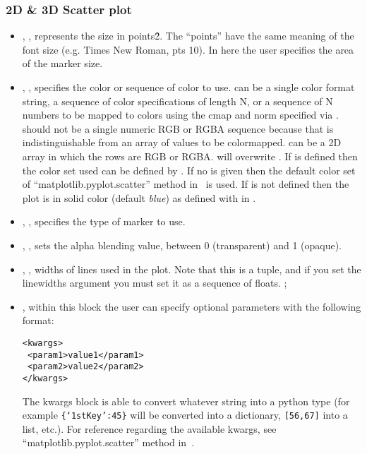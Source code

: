 \subsubsection{2D \& 3D Scatter plot}
  \begin{itemize}
    \item {}, , represents the size
    in points\^2. The ``points'' have the same meaning of the font size (e.g. Times New Roman, pts 10).
    In here the user specifies the area of the marker size.
    \item {}, , specifies the color or
    sequence of color to use.
     can be a single color format string, a sequence of color
    specifications of length N, or a sequence of N numbers to be mapped to
    colors using the cmap and norm specified via .
    \nb {} should not be a single numeric RGB or RGBA sequence because
    that is indistinguishable from an array of values to be colormapped.
     can be a 2D array in which the rows are RGB or RGBA.
    \nb {} will  overwrite .  If  is defined then the color set used can be defined by . 
    If no  is given then the default color set of  ``matplotlib.pyplot.scatter'' method in~\cite{MatPlotLib} is used.
    If  is not defined then the plot is in solid color (default \textit{blue}) as defined with  in .
   \item {}, , specifies the type
    of marker to use.
    \item {}, , sets the alpha
    blending value, between 0 (transparent) and 1 (opaque).
    \item {}, , widths of
    lines used in the plot.
    Note that this is a tuple, and if you set the linewidths argument you must
    set it as a sequence of floats.
    ;
    \item {}, within this block the user can specify optional parameters
    with the following format:

\begin{lstlisting}[style=XML]
<kwargs>
 <param1>value1</param1>
 <param2>value2</param2>
</kwargs>
\end{lstlisting}

  The kwargs block is able to convert whatever string into a python type (for
  example  \texttt{\{`1stKey':45\}} will
  be converted into a dictionary, 
  \texttt{[56,67]}  into a list, etc.).
    For reference regarding the available kwargs, see
    ``matplotlib.pyplot.scatter'' method in~\cite{MatPlotLib}.
  \end{itemize}


